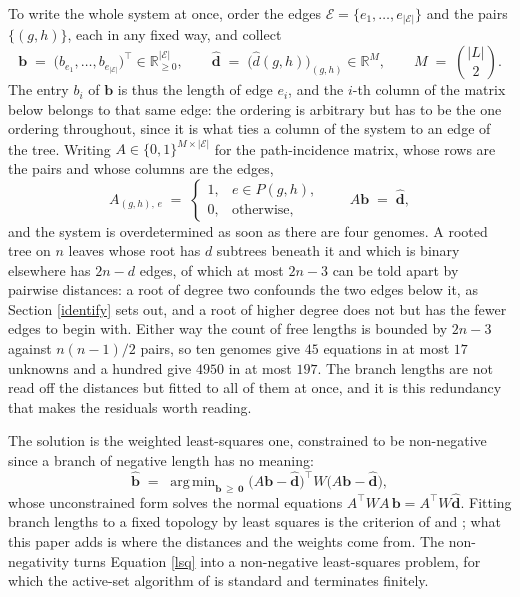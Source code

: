 \documentclass[pdflatex,sn-vancouver-num]{sn-jnl}
\DeclareMathOperator*{\argmin}{arg\,min}
\begin{document}
To write the whole system at once, order the edges $\mathcal{E} = \{e_1, \dots, e_{\lvert \mathcal{E}
\rvert}\}$ and the pairs $\{(g,h)\}$, each in any fixed way, and collect
%
\begin{equation*}
  \mathbf{b} \;=\; \bigl(b_{e_1}, \dots, b_{e_{\lvert \mathcal{E} \rvert}}\bigr)^{\!\top}
    \in \mathbb{R}^{\lvert \mathcal{E} \rvert}_{\geq 0} ,
  \qquad
  \widehat{\mathbf{d}} \;=\; \bigl(\widehat{d}(g,h)\bigr)_{(g,h)} \in \mathbb{R}^{M} ,
  \qquad
  M \;=\; \binom{\lvert L \rvert}{2} .
\end{equation*}
%
The entry $b_i$ of $\mathbf{b}$ is thus the length of edge $e_i$, and the $i$-th column of the matrix
below belongs to that same edge: the ordering is arbitrary but has to be the one ordering throughout,
since it is what ties a column of the system to an edge of the tree. Writing
$A \in \{0,1\}^{M \times \lvert \mathcal{E} \rvert}$ for the path-incidence matrix, whose rows are
the pairs and whose columns are the edges,
%
\begin{equation}
  A_{(g,h),\,e} \;=\;
  \begin{cases}
    1, & e \in P(g,h) , \\
    0, & \text{otherwise} ,
  \end{cases}
  \qquad
  A\mathbf{b} \;=\; \widehat{\mathbf{d}} ,
  \label{designmatrix}
\end{equation}
%
and the system is overdetermined as soon as there are four genomes. A rooted tree on $n$ leaves whose
root has $d$ subtrees beneath it and which is binary elsewhere has $2n-d$ edges, of which at most
$2n-3$ can be told apart by pairwise distances: a root of degree two confounds the two edges below it,
as Section \ref{identify} sets out, and a root of higher degree does not but has the fewer edges to
begin with. Either way the count of free lengths is bounded by $2n-3$ against $n(n-1)/2$ pairs, so ten
genomes give $45$ equations in at most $17$ unknowns and a hundred give $4950$ in at most $197$. The branch lengths are not read off the distances but
fitted to all of them at once, and it is this redundancy that makes the residuals worth reading.

The solution is the weighted least-squares one, constrained to be non-negative since a branch of
negative length has no meaning:
%
\begin{equation}
  \widehat{\mathbf{b}} \;=\; \argmin_{\mathbf{b} \,\geq\, \mathbf{0}}
    \bigl( A\mathbf{b} - \widehat{\mathbf{d}} \bigr)^{\!\top} W
    \bigl( A\mathbf{b} - \widehat{\mathbf{d}} \bigr) ,
  \label{lsq}
\end{equation}
%
whose unconstrained form solves the normal equations $A^{\!\top} W A \, \mathbf{b} = A^{\!\top} W
\widehat{\mathbf{d}}$. Fitting branch lengths to a fixed topology by least squares is the criterion
of \cite{cavalli1967phylogenetic} and \cite{fitch1967construction}; what this paper adds is where the
distances and the weights come from. The non-negativity turns Equation \eqref{lsq} into a
non-negative least-squares problem, for which the active-set algorithm of \cite{lawson1995solving} is
standard and terminates finitely.
\end{document}
